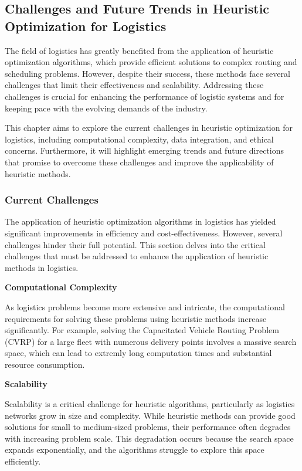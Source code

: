 \documentclass{article}
\begin{document}
    \newpage

    \subsection{Challenges and Future Trends in Heuristic Optimization for Logistics}\label{sec:challenges-and-future-trends-in-heuristic-optimization-for-logistics}

    The field of logistics has greatly benefited from the application of heuristic optimization algorithms, which provide efficient solutions to complex routing and scheduling problems. However, despite their success, these methods face several challenges that limit their effectiveness and scalability. Addressing these challenges is crucial for enhancing the performance of logistic systems and for keeping pace with the evolving demands of the industry.

    This chapter aims to explore the current challenges in heuristic optimization for logistics, including computational complexity, data integration, and ethical concerns. Furthermore, it will highlight emerging trends and future directions that promise to overcome these challenges and improve the applicability of heuristic methods.

    \subsubsection{Current Challenges}\label{subsec:current-challenges}

    The application of heuristic optimization algorithms in logistics has yielded significant improvements in efficiency and cost-effectiveness. However, several challenges hinder their full potential. This section delves into the critical challenges that must be addressed to enhance the application of heuristic methods in logistics.

    \textbf{Computational Complexity}

    As logistics problems become more extensive and intricate, the computational requirements for solving these problems using heuristic methods increase significantly. For example, solving the Capacitated Vehicle Routing Problem (CVRP) for a large fleet with numerous delivery points involves a massive search space, which can lead to extremly long computation times and substantial resource consumption. \cite{Puri2023}

    \textbf{Scalability}

    Scalability is a critical challenge for heuristic algorithms, particularly as logistics networks grow in size and complexity. While heuristic methods can provide good solutions for small to medium-sized problems, their performance often degrades with increasing problem scale. This degradation occurs because the search space expands exponentially, and the algorithms struggle to explore this space efficiently. \cite{Puri2023}
\end{document}
